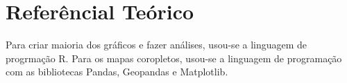 \chapter{Referêncial Teórico}

Para criar maioria dos gráficos e fazer análises, usou-se a linguagem de progrmação R. Para os mapas coropletos, usou-se a linguagem de programação com as bibliotecas Pandas, Geopandas e Matplotlib.